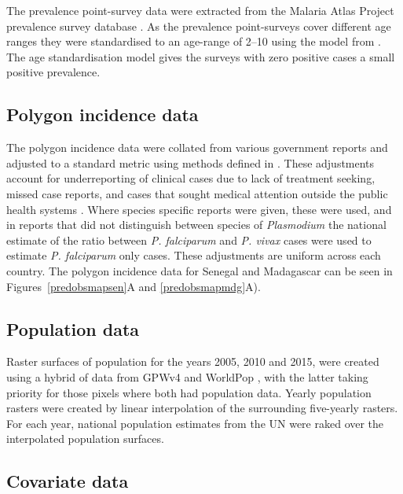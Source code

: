\documentclass[10pt,letterpaper]{article}
\begin{document}
The prevalence point-survey data were extracted from the Malaria Atlas Project prevalence survey database \cite{bhatt2015effect, guerra2007assembling, gething2011new, pfeffer2018ma}.
As the prevalence point-surveys cover different age ranges they were standardised to an age-range of 2--10 using the model from \cite{smith2007standardizing}.
The age standardisation model gives the surveys with zero positive cases a small positive prevalence.

\subsection*{Polygon incidence data}


The polygon incidence data were collated from various government reports and adjusted to a standard metric using methods defined in \cite{cibulskis2011worldwide, weiss2019mapping}.
These adjustments account for underreporting of clinical cases due to lack of treatment seeking, missed case reports, and cases that sought medical attention outside the public health systems \cite{battle2016treatment}.
Where species specific reports were given, these were used, and in reports that did not distinguish between species of \emph{Plasmodium} the national estimate of the ratio between \emph{P. falciparum} and \emph{P. vivax} cases were used to estimate \emph{P. falciparum} only cases.
These adjustments are uniform across each country.
The polygon incidence data for Senegal and Madagascar can be seen in Figures~\ref{predobsmapsen}A and \ref{predobsmapmdg}A).


\subsection*{Population data}

Raster surfaces of population for the years 2005, 2010 and 2015, were created using a hybrid of data from GPWv4 \cite{gpw4} and WorldPop \cite{tatem2017worldpop}, with the latter taking priority for those pixels where both had population data. 
Yearly population rasters were created by linear interpolation of the surrounding five-yearly rasters.
For each year, national population estimates from the UN were raked over the interpolated population surfaces. 


\subsection*{Covariate data}
\end{document}
